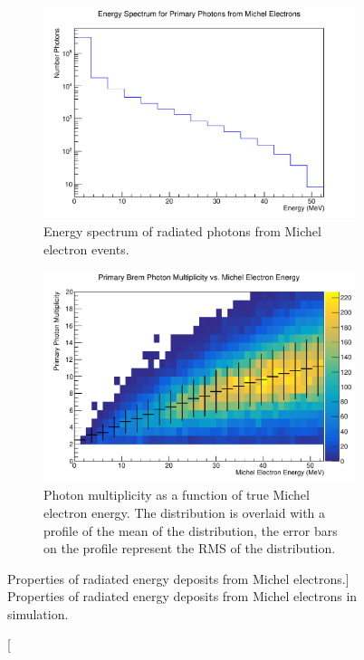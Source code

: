 \begin{figure}

	\centering

	\begin{subfigure}[b]{\textwidth}
		\includegraphics[width=\textwidth]{figures/photon_spec.pdf}
		\caption{Energy spectrum of radiated photons from Michel electron events.}
		\label{fig:photon_spec}
	\end{subfigure}

	\vspace{5mm}

	\begin{subfigure}[b]{\textwidth}
		\includegraphics[width=\textwidth]{figures/photon_mult.pdf}
		\caption{Photon multiplicity as a function of true Michel electron energy.
		The distribution is overlaid with a profile of the mean of the distribution,
		the error bars on the profile represent the RMS of the distribution.}
		\label{fig:photon_mult}
	\end{subfigure}

	\caption
	[Properties of radiated energy deposits from Michel electrons.]
	{Properties of radiated energy deposits from Michel electrons in \protodune{}
	simulation.}

	\label{fig:photon_prop}

\end{figure}

